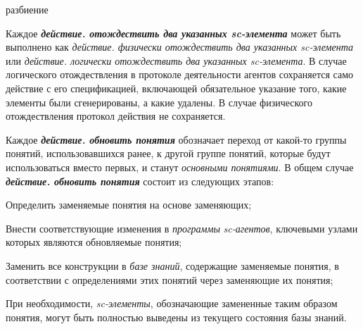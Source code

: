 \begin{SCn}
\begin{scnindent}
\begin{scnindent}
\end{scnindent}
\end{scnindent}

\begin{scnrelfromset}{разбиение}
\end{scnrelfromset}
\end{SCn}

Каждое \textbf{\textit{действие. отождествить два указанных sc-элемента}} может быть выполнено как \textit{действие. физически отождествить два указанных sc-элемента} или \textit{действие. логически отождествить два указанных sc-элемента}. В случае логического отождествления в протоколе деятельности агентов сохраняется само действие с его спецификацией, включающей обязательное указание того, какие элементы были сгенерированы, а какие удалены. В случае физического отождествления протокол действия не сохраняется.

Каждое \textbf{\textit{действие. обновить понятия}} обозначает переход от какой-то группы понятий, использовавшихся ранее, к другой группе понятий, которые будут использоваться вместо первых, и станут \textit{основными понятиями}.
В общем случае \textbf{\textit{действие. обновить понятия}} состоит из следующих этапов:

\begin{textitemize}
	\item Определить заменяемые понятия на основе заменяющих;
	\item Внести соответствующие изменения в \textit{программы} \textit{sc-агентов}, ключевыми узлами которых являются обновляемые понятия;
	\item Заменить все конструкции в \textit{базе знаний}, содержащие заменяемые понятия, в соответствии с определениями этих понятий через заменяющие их понятия;
	\item При необходимости, \textit{sc-элементы}, обозначающие замененные таким образом понятия, могут быть полностью выведены из текущего состояния базы знаний.
\end{textitemize}

